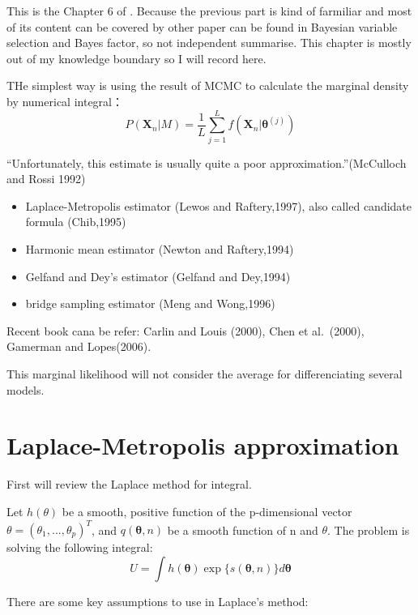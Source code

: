 \documentclass[
]{book}
\theoremstyle{definition}
\theoremstyle{definition}
\theoremstyle{definition}
\theoremstyle{remark}
\begin{document}
This is the Chapter 6 of \citep{ando2010bayesian}.
Because the previous part is kind of farmiliar and most of its content can be covered by other paper can be found in Bayesian variable selection and Bayes factor, so not independent summarise. This chapter is mostly out of my knowledge boundary so I will record here.

THe simplest way is using the result of MCMC to calculate the marginal density by numerical integral：
\[
P\left(\boldsymbol{X}_{n} | M\right)=\frac{1}{L} \sum_{j=1}^{L} f\left(\boldsymbol{X}_{n} | \boldsymbol{\theta}^{(j)}\right)
\]

``Unfortunately, this estimate is usually quite a poor approximation.''(McCulloch and Rossi 1992)

\begin{itemize}
\item
  Laplace-Metropolis estimator (Lewos and Raftery,1997), also called candidate formula (Chib,1995)
\item
  Harmonic mean estimator (Newton and Raftery,1994)
\item
  Gelfand and Dey's estimator (Gelfand and Dey,1994)
\item
  bridge sampling estimator (Meng and Wong,1996)
\end{itemize}

Recent book cana be refer:
Carlin and Louis (2000), Chen et al.~(2000), Gamerman and Lopes(2006).

This marginal likelihood will not consider the average for differenciating several models.

\hypertarget{laplace-metropolis-approximation}{%
\section{Laplace-Metropolis approximation}\label{laplace-metropolis-approximation}}

First will review the Laplace method for integral.

Let \(h(\theta)\) be a smooth, positive function of the p-dimensional vector \(\mathbb \theta=(\theta_1,...,\theta_p)^T\), and \(q(\boldsymbol{\theta}, n)\) be a smooth function of n and \(\theta\).
The problem is solving the following integral:
\[
U=\int h(\boldsymbol{\theta}) \exp \{s(\boldsymbol{\theta}, n)\} d \boldsymbol{\theta}
\]

There are some key assumptions to use in Laplace's method:
\end{document}
